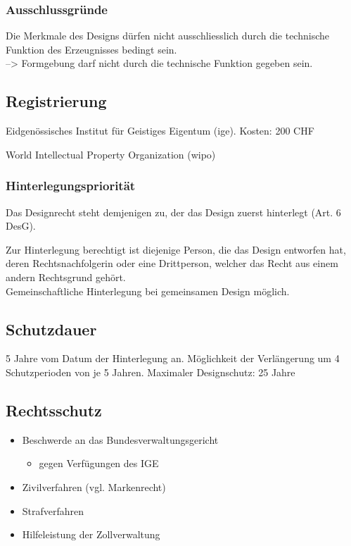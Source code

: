 \subsubsection{Ausschlussgründe}

Die Merkmale des Designs dürfen nicht ausschliesslich durch die
technische Funktion des Erzeugnisses bedingt sein.\\
--> Formgebung darf nicht durch die technische Funktion
gegeben sein.

\subsection{Registrierung}

\begin{description}
	\tightlist
	\item[Schweiz] Eidgenössisches Institut für Geistiges Eigentum 
	(ige). Kosten: 200 CHF
	\item[International] World Intellectual Property Organization
	(wipo)
\end{description}


\subsubsection{Hinterlegungspriorität}

Das Designrecht steht demjenigen zu, der das Design zuerst hinterlegt
(Art. 6 DesG).

Zur Hinterlegung berechtigt ist diejenige Person, die das Design
entworfen hat, deren Rechtsnachfolgerin oder eine Drittperson, welcher
das Recht aus einem andern Rechtsgrund gehört.\\
Gemeinschaftliche Hinterlegung bei gemeinsamen Design möglich.

\subsection{Schutzdauer}

5 Jahre vom Datum der Hinterlegung an. Möglichkeit der Verlängerung um
4 Schutzperioden von je 5 Jahren. Maximaler Designschutz: 25 Jahre

\subsection{Rechtsschutz}

\begin{itemize}
	\tightlist
	\item Beschwerde an das Bundesverwaltungsgericht
	\begin{itemize}
		\tightlist
		\item gegen Verfügungen des IGE
	\end{itemize}
	\item Zivilverfahren (vgl. Markenrecht)
	\item Strafverfahren
	\item Hilfeleistung der Zollverwaltung
\end{itemize}

